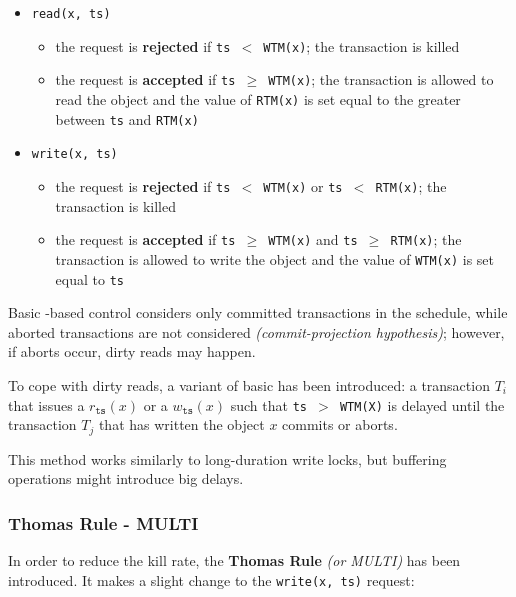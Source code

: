 \documentclass[english]{article}
\begin{document}
\begin{itemize}
  \item \texttt{read(x, ts)}
        \begin{itemize}
          \item[\xmarkthin] the request is \textbf{rejected} if \texttt{ts \(<\) WTM(x)}; the transaction is killed
          \item[\cmarkthin] the request is \textbf{accepted} if \texttt{ts \(\geq\) WTM(x)}; the transaction is allowed to read the object and the value of \texttt{RTM(x)} is set equal to the greater between \texttt{ts} and \texttt{RTM(x)}
        \end{itemize}
  \item \texttt{write(x, ts)}
        \begin{itemize}
          \item[\xmarkthin] the request is \textbf{rejected} if \texttt{ts \(<\) WTM(x)} or \texttt{ts \(<\) RTM(x)}; the transaction is killed
          \item[\cmarkthin] the request is \textbf{accepted} if \texttt{ts \(\geq\) WTM(x)} and \texttt{ts \(\geq\) RTM(x)}; the transaction is allowed to write the object and the value of \texttt{WTM(x)} is set equal to \texttt{ts}
        \end{itemize}
\end{itemize}

\bigskip
Basic \ts-based control considers only committed transactions in the schedule, while aborted transactions are not considered \textit{(commit-projection hypothesis)};
however, if aborts occur, dirty reads may happen.

To cope with dirty reads, a variant of basic \ts has been introduced: a transaction \(T_i\) that issues a \(r_{\texttt{ts}}(x)\) or a \(w_{\texttt{ts}}(x)\) such that \texttt{ts \(>\) WTM(X)} is delayed until the transaction \(T_j\) that has written the object \(x\) commits or aborts.

This method works similarly to long-duration write locks, but buffering operations might introduce big delays.

\subsubsection{Thomas Rule - \ts MULTI}

In order to reduce the kill rate, the \textbf{Thomas Rule} \textit{(or \ts MULTI)} has been introduced.
It makes a slight change to the \texttt{write(x, ts)} request:
\end{document}
